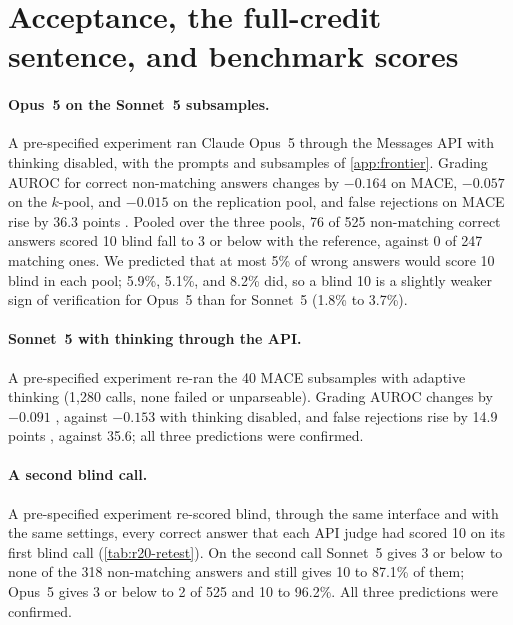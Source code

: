 \FloatBarrier
\section{Acceptance, the full-credit sentence, and benchmark scores}
\label{app:acceptance}

\paragraph{Opus~5 on the Sonnet~5 subsamples.}
A pre-specified experiment ran Claude Opus~5 through the Messages API with thinking disabled, with the prompts and subsamples of \cref{app:frontier}. Grading AUROC for correct non-matching answers changes by $-0.164$  on \textsc{MACE}, $-0.057$ on the $k$-pool, and $-0.015$  on the replication pool, and false rejections on \textsc{MACE} rise by 36.3 points . Pooled over the three pools, 76 of 525 non-matching correct answers scored 10 blind fall to 3 or below with the reference, against 0 of 247 matching ones. We predicted that at most 5\% of wrong answers would score 10 blind in each pool; 5.9\%, 5.1\%, and 8.2\% did, so a blind 10 is a slightly weaker sign of verification for Opus~5 than for Sonnet~5 (1.8\% to 3.7\%).

\paragraph{Sonnet~5 with thinking through the API.}
A pre-specified experiment re-ran the 40 \textsc{MACE} subsamples with adaptive thinking (1,280 calls, none failed or unparseable). Grading AUROC changes by $-0.091$ , against $-0.153$ with thinking disabled, and false rejections rise by 14.9 points , against 35.6; all three predictions were confirmed.

\paragraph{A second blind call.}
A pre-specified experiment re-scored blind, through the same interface and with the same settings, every correct answer that each API judge had scored 10 on its first blind call (\cref{tab:r20-retest}). On the second call Sonnet~5 gives 3 or below to none of the 318 non-matching answers and still gives 10 to 87.1\% of them; Opus~5 gives 3 or below to 2 of 525 and 10 to 96.2\%. All three predictions were confirmed.

